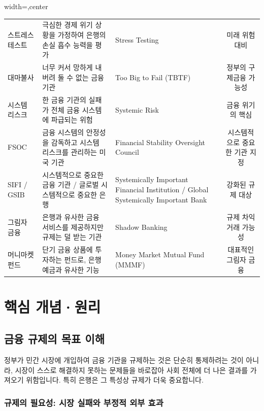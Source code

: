 \documentclass[11pt,a4paper]{article}
\begin{document}
\begin{adjustbox}{width=\textwidth,center}
\begin{tabular}{lllc}
스트레스 테스트 & 극심한 경제 위기 상황을 가정하여 은행의 손실 흡수 능력을 평가 & Stress Testing & 미래 위험 대비 \\
대마불사 & 너무 커서 망하게 내버려 둘 수 없는 금융 기관 & Too Big to Fail (TBTF) & 정부의 구제금융 가능성 \\
시스템 리스크 & 한 금융 기관의 실패가 전체 금융 시스템에 파급되는 위험 & Systemic Risk & 금융 위기의 핵심 \\
FSOC & 금융 시스템의 안정성을 감독하고 시스템 리스크를 관리하는 미국 기관 & Financial Stability Oversight Council & 시스템적으로 중요한 기관 지정 \\
SIFI / GSIB & 시스템적으로 중요한 금융 기관 / 글로벌 시스템적으로 중요한 은행 & Systemically Important Financial Institution / Global Systemically Important Bank & 강화된 규제 대상 \\
그림자 금융 & 은행과 유사한 금융 서비스를 제공하지만 규제는 덜 받는 기관 & Shadow Banking & 규제 차익거래 가능성 \\
머니마켓펀드 & 단기 금융 상품에 투자하는 펀드로, 은행 예금과 유사한 기능 & Money Market Mutual Fund (MMMF) & 대표적인 그림자 금융 \\
\bottomrule
\end{tabular}
\end{adjustbox}

\newpage
\section*{핵심 개념·원리}

\subsection{금융 규제의 목표 이해}

정부가 민간 시장에 개입하여 금융 기관을 규제하는 것은 단순히 통제하려는 것이 아니라, 시장이 스스로 해결하지 못하는 문제들을 바로잡아 사회 전체에 더 나은 결과를 가져오기 위함입니다. 특히 은행은 그 특성상 규제가 더욱 중요합니다.

\subsubsection{규제의 필요성: 시장 실패와 부정적 외부 효과}
\end{document}
